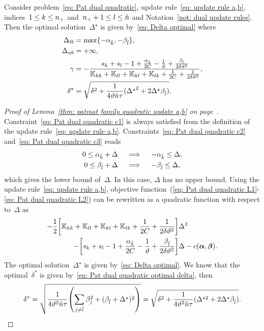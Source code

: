\begin{lemma}\label{thm: patmat family quadratic update a,b}
  Consider problem~\eqref{eq: Pat dual quadratic}, update rule~\eqref{eq: update rule a,b}, indices~$1 \leq k \leq n_{+}$ and~$n_{+} + 1 \leq l \leq \tilde{n}$ and Notation~\ref{not: dual update rules}. Then the optimal solution~$\Delta^{\star}$ is given by~\eqref{eq: Delta optimal} where
  \begin{align*}
    \Delta_{lb} & = \max\{- \alpha_{\hat{k}}, - \beta_{\hat{l}}\}, \\
    \Delta_{ub} & = +\infty, \\
    \gamma      & = -\frac{s_k + s_l  - 1 + \frac{\alpha_{\hat{k}}}{2C} - \frac{1}{\vartheta} + \frac{\beta_{\hat{l}}}{2 \delta \vartheta^2}}{\mathbb{K}_{kk} + \mathbb{K}_{ll} + \mathbb{K}_{kl} + \mathbb{K}_{lk} + \frac{1}{2C} + \frac{1}{2 \delta \vartheta^2}}, \\
    \delta^{\star}  & = \sqrt{\delta^2 + \frac{1}{4 \vartheta \tilde{n} \tau}({\Delta^{\star}}^2 + 2 \Delta^{\star} \beta_{\hat{l}})}.
  \end{align*}
\end{lemma}

\begin{proof}[Proof of Lemma~\ref{thm: patmat family quadratic update a,b} on page~\pageref{thm: patmat family quadratic update a,b}]
  Constraint~\eqref{eq: Pat dual quadratic c1} is always satisfied from the definition of the update rule~\eqref{eq: update rule a,b}. Constraints~\eqref{eq: Pat dual quadratic c2} and~\eqref{eq: Pat dual quadratic c3} reads
  \begin{align*}
    0 \leq \alpha_{\hat{k}} + \Delta
    & \quad \implies \quad
    - \alpha_{\hat{k}} \leq \Delta, \\
    0 \leq \beta_{\hat{l}} + \Delta
    & \quad \implies \quad
    - \beta_{\hat{l}} \leq \Delta, \\
  \end{align*}
  which gives the lower bound of~$\Delta.$ In this case, $\Delta$ has no upper bound. Using the update rule~\eqref{eq: update rule a,b}, objective function~(\ref{eq: Pat dual quadratic L1}-\ref{eq: Pat dual quadratic L2}) can be rewritten as a quadratic function with respect to~$\Delta$ as
  \begin{align*}
    - \frac{1}{2} \Brac[s]{\K_{kk} + \K_{ll} + \K_{kl} + \K_{lk} + \frac{1}{2C} + \frac{1}{2 \delta \vartheta^2}} & \Delta^2 \\
    - \Brac[s]{s_k + s_l - 1 + \frac{\alphak}{2C} - \frac{1}{\vartheta} + \frac{\betal}{2\delta\vartheta^2}} & \Delta
    - c(\bm{\alpha}, \bm{\beta}).
  \end{align*}
  The optimal solution~$\Delta^{\star}$ is given by~\eqref{eq: Delta optimal}. We know that the optimal~$\delta^*$ is given by~\eqref{eq: Pat dual quadratic optimal delta}, then
  \begin{equation*}
    \delta^*
      = \sqrt{\frac{1}{4\vartheta^2 \ntil \tau} \Brac{\sum_{j\neq \hat{l}} \beta_j^2 + (\betal + \Delta^\star)^2}}
      = \sqrt{\delta^2 + \frac{1}{4\vartheta^2 \ntil \tau} (\Delta^{\star2} + 2\Delta^\star \betal)}.
  \end{equation*}
\end{proof}

